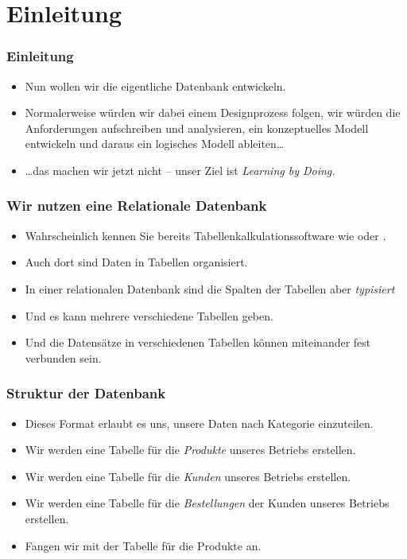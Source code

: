 \documentclass[aspectratio=169,mathserif,notheorems]{beamer}%
\subtitle{9.~Fabrik-Datenbank:~Tabelle \emph{product}}%
\begin{document}
%
%
\startPresentation%
%
\section{Einleitung}%
%
\begin{frame}%
\frametitle{Einleitung}%
\begin{itemize}%
\item Nun wollen wir die eigentliche Datenbank entwickeln.%
\item<2-> Normalerweise würden wir dabei einem Designprozess folgen, wir würden die Anforderungen aufschreiben und analysieren, ein konzeptuelles Modell entwickeln und daraus ein logisches Modell ableiten\dots%
\item<3-> {\dots}das machen wir jetzt nicht -- unser Ziel ist \emph{Learning by Doing.}%
\end{itemize}%
\end{frame}%
%
\begin{frame}%
\frametitle{Wir nutzen eine Relationale Datenbank}%
\begin{itemize}%
\item Wahrscheinlich kennen Sie bereits Tabellenkalkulationssoftware wie \microsoftExcel\cite{P2020MSS2ABG,A2024TSAFMSS2,W2018MSSDB} oder \libreofficeCalc\cite{DF2024LTDF,GL2012LTSOOSSCBAFACSOL,S2022L7PFEUU}.%
\item<2-> Auch dort sind Daten in Tabellen organisiert.%
\item<3-> In einer relationalen Datenbank sind die Spalten der Tabellen aber \emph{typisiert}%
\item<5-> Und es kann mehrere verschiedene Tabellen geben.%
\item<6-> Und die Datensätze in verschiedenen Tabellen können miteinander fest verbunden sein.%
\end{itemize}%
\end{frame}%
%
\begin{frame}%
\frametitle{Struktur der Datenbank}%
\begin{itemize}%
\item Dieses Format erlaubt es uns, unsere Daten nach Kategorie einzuteilen.%
\item<2-> Wir werden eine Tabelle für die \emph{Produkte} unseres Betriebs erstellen.%
\item<3-> Wir werden eine Tabelle für die \emph{Kunden} unseres Betriebs erstellen.%
\item<4-> Wir werden eine Tabelle für die \emph{Bestellungen} der Kunden unseres Betriebs erstellen.%
\item<5-> Fangen wir mit der Tabelle für die Produkte an.%
\end{itemize}%
\end{frame}%
\end{document}
